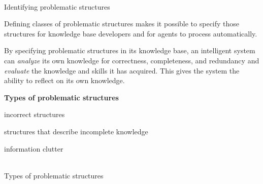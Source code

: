 \begin{frame}{\\Identifying problematic structures}
	\topline
	\justifying
	\vspace{5mm}

	Defining classes of problematic structures makes it possible to specify those structures for knowledge base developers and for agents to process automatically.

	By specifying problematic structures in its knowledge base, an intelligent system can \textit{analyze} its own knowledge for correctness, completeness, and redundancy and \textit{evaluate} the knowledge and skills it has acquired. This gives the system the ability to reflect on its own knowledge.

	\textbf{Types of problematic structures}
	\begin{textitemize}
		\item incorrect structures
		\item structures that describe incomplete knowledge
		\item information clutter
	\end{textitemize}
\end{frame}

\begin{frame}{\\Types of problematic structures}
	\topline
	\justifying
	\begin{SCn}


	\end{SCn}
\end{frame}

